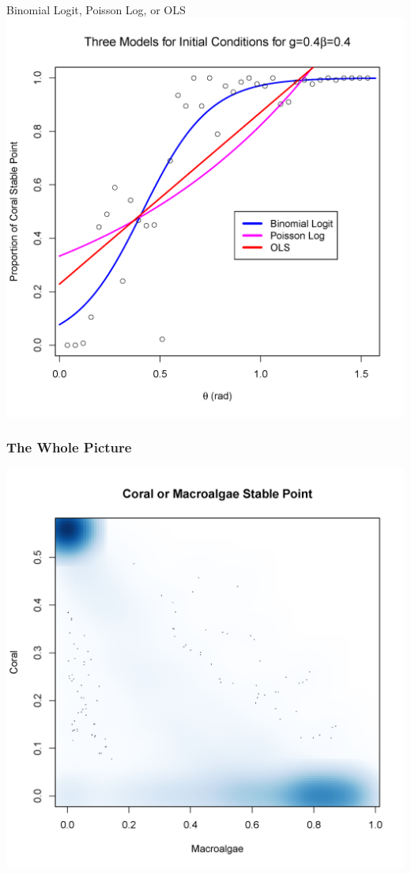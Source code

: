 \begin{frame}{Binomial Logit, Poisson Log, or OLS}
\includegraphics[scale=.325]{theta_threemodels.png}
\end{frame}

\begin{frame}\frametitle{The Whole Picture}
\includegraphics[scale=.325]{unifiedplot.png}
\end{frame}

